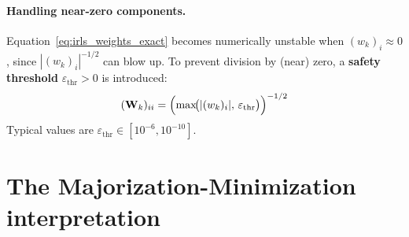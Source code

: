 \paragraph{Handling near-zero components.}
Equation~\eqref{eq:irls_weights_exact} becomes numerically unstable when $(w_k)_i
\approx 0$, since $|(w_k)_i|^{-1/2}$ can blow up. To prevent division by (near) zero,
a \textbf{safety threshold} $\varepsilon_{\mathrm{thr}} > 0$ is introduced:
\begin{equation}
    (\mathbf{W}_k)_{ii} = \Bigl(\max\!\bigl(|(w_k)_i|,\, \varepsilon_{\mathrm{thr}}\bigr)\Bigr)^{-1/2}
    \label{eq:irls_weights}
\end{equation}
Typical values are $\varepsilon_{\mathrm{thr}} \in [10^{-6}, 10^{-10}]$.

\section{The Majorization-Minimization interpretation}
\label{sec:irls_mm}

